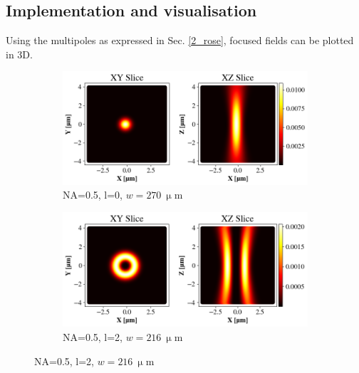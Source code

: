\subsection{Implementation and visualisation}
Using the multipoles as expressed in Sec. \ref{2_rose}, focused fields can be plotted in 3D. 

\begin{figure}[htbp]
    \centering
    \begin{subfigure}[b]{0.49\textwidth}
        \centering
        \includegraphics[width=\textwidth]{Figures/Efoc_NA5_l0.png} %
        \caption{NA=0.5, l=0, $w=270\ \mathrm{\upmu m}$}
        \label{fig:a}
    \end{subfigure}
    \hfill
    \begin{subfigure}[b]{0.49\textwidth}
        \centering
        \includegraphics[width=\textwidth]{Figures/Efoc_NA5_l2.png} %
        \caption{NA=0.5, l=2, $w=216\ \mathrm{\upmu m}$}
        \label{fig:b}
    \end{subfigure}

    \vspace{1em} %


\end{figure}
